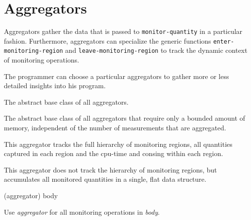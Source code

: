 \section{Aggregators}
\label{sec:aggregators}

Aggregators gather the data that is passed to \texttt{monitor-quantity} in
a particular fashion.  Furthermore, aggregators can specialize the generic
functions \texttt{enter-monitoring-region} and
\texttt{leave-monitoring-region} to track the dynamic context of monitoring
operations.

The programmer can choose a particular aggregators to gather more or less
detailed insights into his program.


The abstract base class of all aggregators.


The abstract base class of all aggregators that require only a bounded
amount of memory, independent of the number of measurements that are
aggregated.


This aggregator tracks the full hierarchy of monitoring regions, all
quantities captured in each region and the cpu-time and consing within each
region.


This aggregator does not track the hierarchy of monitoring regions, but
accumulates all monitored quantities in a single, flat data structure.

 {(aggregator) \body{} body}

Use \textit{aggregator} for all monitoring operations in \textit{body}.